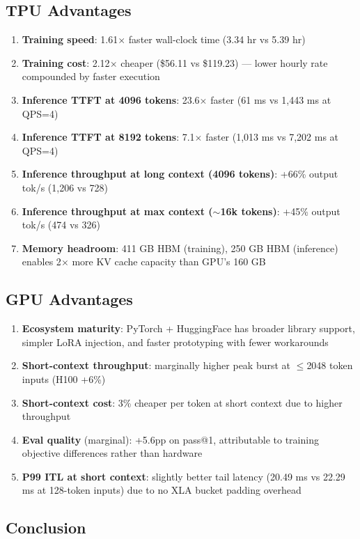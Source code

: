 \documentclass[11pt,a4paper]{article}
\begin{document}
\subsection{TPU Advantages}
\begin{enumerate}[nosep]
  \item \textbf{Training speed}: 1.61$\times$ faster wall-clock time (3.34 hr vs 5.39 hr)
  \item \textbf{Training cost}: 2.12$\times$ cheaper (\$56.11 vs \$119.23) --- lower hourly rate compounded by faster execution
  \item \textbf{Inference TTFT at 4096 tokens}: 23.6$\times$ faster (61 ms vs 1,443 ms at QPS=4)
  \item \textbf{Inference TTFT at 8192 tokens}: 7.1$\times$ faster (1,013 ms vs 7,202 ms at QPS=4)
  \item \textbf{Inference throughput at long context (4096 tokens)}: +66\% output tok/s (1,206 vs 728)
  \item \textbf{Inference throughput at max context ($\sim$16k tokens)}: +45\% output tok/s (474 vs 326)
  \item \textbf{Memory headroom}: 411 GB HBM (training), 250 GB HBM (inference) enables 2$\times$ more KV cache capacity than GPU's 160 GB
\end{enumerate}

\subsection{GPU Advantages}
\begin{enumerate}[nosep]
  \item \textbf{Ecosystem maturity}: PyTorch + HuggingFace has broader library support, simpler LoRA injection, and faster prototyping with fewer workarounds
  \item \textbf{Short-context throughput}: marginally higher peak burst at $\leq$2048 token inputs (H100 +6\%)
  \item \textbf{Short-context cost}: 3\% cheaper per token at short context due to higher throughput
  \item \textbf{Eval quality} (marginal): +5.6pp on pass@1, attributable to training objective differences rather than hardware
  \item \textbf{P99 ITL at short context}: slightly better tail latency (20.49 ms vs 22.29 ms at 128-token inputs) due to no XLA bucket padding overhead
\end{enumerate}

\subsection{Conclusion}
\end{document}
